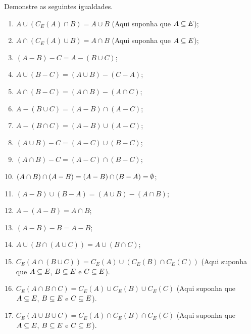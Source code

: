 \documentclass[12pt]{article}
\begin{document}
\questao Demonstre as seguintes igualdades.
\begin{enumerate}[label={\alph*})]
\item $A \cup (C_E(A) \cap B) = A \cup B$ (Aqui suponha que $A \subseteq E$);

\item $A \cap (C_E(A) \cup B) = A \cap B$ (Aqui suponha que $A \subseteq E$);

\item $(A - B) - C = A - (B \cup C)$;

\item $A \cup (B - C) = (A \cup B) - (C - A)$;

\item $A \cap (B - C) = (A \cap B) - (A \cap C)$;

\item $A - (B \cup C) = (A - B) \cap (A - C)$;

\item $A - (B \cap C) = (A - B) \cup (A - C)$;

\item $(A \cup B) - C = (A - C) \cup (B - C)$;

\item $(A \cap B) - C = (A - C) \cap (B - C)$;

\item $(A \cap B) \cap (A - B) = (A - B) \cap (B - A) = \emptyset$;

\item $(A - B) \cup (B - A) = (A \cup B) - (A \cap B)$;

\item $A - (A - B) = A \cap B$;

\item $(A - B) - B = A - B$;

\item $A \cup (B \cap (A \cup C)) = A \cup (B \cap C)$;

\item $C_E( A \cap (B \cup C)) = C_E(A) \cup (C_E(B)\cap C_E(C))$ (Aqui suponha que $A \subseteq E$, $B \subseteq E$ e $C \subseteq E$).

\item $C_E( A \cap B \cap C) = C_E(A) \cup C_E(B) \cup C_E(C)$ (Aqui suponha que $A \subseteq E$, $B \subseteq E$ e $C \subseteq E$).

\item $C_E( A \cup B \cup C) = C_E(A) \cap C_E(B) \cap C_E(C)$ (Aqui suponha que $A \subseteq E$, $B \subseteq E$ e $C \subseteq E$).
\end{enumerate}
\end{document}
